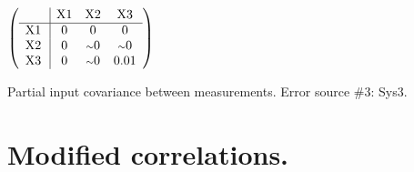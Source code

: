 \begin{table}[H]
\scriptsize
\begin{center}
\renewcommand{\arraystretch}{1.1}
\begin{math}\left(\begin{array}{c|ccc}
 & \mathrm{X1} & 
\mathrm{X2} & 
\mathrm{X3} \\
\hline
\mathrm{X1} \hspace*{2pt} &  0 &  0 &  0 \\
\mathrm{X2} \hspace*{2pt} &  0 &  {\scriptstyle \sim }0 &  {\scriptstyle \sim }0 \\
\mathrm{X3} \hspace*{2pt} &  0 &  {\scriptstyle \sim }0 &       0.01 \\
\end{array}\right)\end{math}
\caption{Partial input covariance between measurements. Error source \#3: Sys3.}
\renewcommand{\arraystretch}{1}
\end{center}
\end{table}
\clearpage
\section{Modified correlations.}
